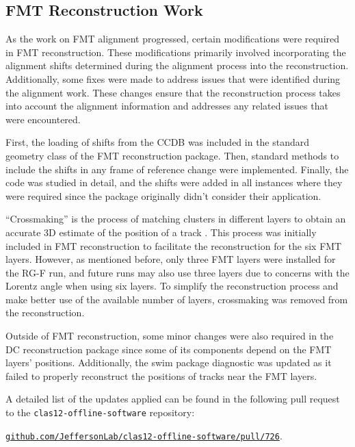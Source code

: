 \subsection{FMT Reconstruction Work}
\label{12.30::fmt_reconstruction_work}
    As the work on FMT alignment progressed, certain modifications were required in FMT reconstruction.
    These modifications primarily involved incorporating the alignment shifts determined during the alignment process into the reconstruction.
    Additionally, some fixes were made to address issues that were identified during the alignment work.
    These changes ensure that the reconstruction process takes into account the alignment information and addresses any related issues that were encountered.

    First, the loading of shifts from the CCDB was included in the standard geometry class of the FMT reconstruction package.
    Then, standard methods to include the shifts in any frame of reference change were implemented.
    Finally, the code was studied in detail, and the shifts were added in all instances where they were required since the package originally didn't consider their application.

    ``Crossmaking'' is the process of matching clusters in different layers to obtain an accurate 3D estimate of the position of a track \cite{ziegler2020}.
    This process was initially included in FMT reconstruction to facilitate the reconstruction for the six FMT layers.
    However, as mentioned before, only three FMT layers were installed for the RG-F run, and future runs may also use three layers due to concerns with the Lorentz angle when using six layers.
    To simplify the reconstruction process and make better use of the available number of layers, crossmaking was removed from the reconstruction.

    Outside of FMT reconstruction, some minor changes were also required in the DC reconstruction package since some of its components depend on the FMT layers' positions.
    Additionally, the swim package diagnostic was updated as it failed to properly reconstruct the positions of tracks near the FMT layers.

    A detailed list of the updates applied can be found in the following pull request to the \texttt{clas12-offline-software} repository:

    \href{github.com/JeffersonLab/clas12-offline-software/pull/726}{\texttt{github.com/JeffersonLab/clas12-offline-software/pull/726}}.
